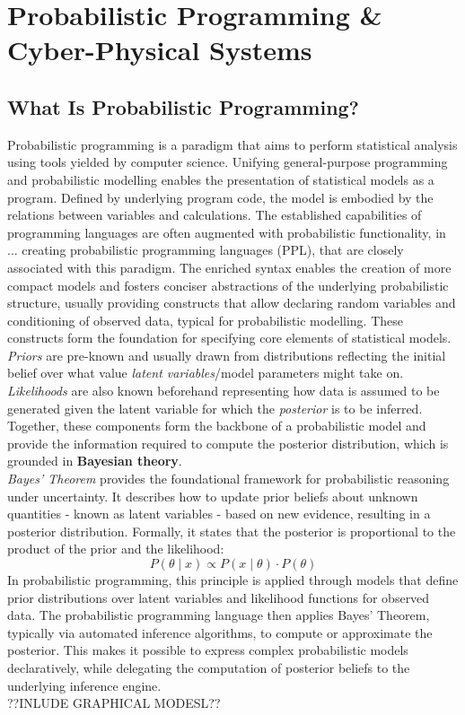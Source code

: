 \documentclass[11pt]{report}
\begin{document}
\chapter{Probabilistic Programming \& Cyber-Physical Systems}
\section{What Is Probabilistic Programming?}

Probabilistic programming is a paradigm that aims to perform statistical analysis using tools yielded by computer science.\cite{introductionprobabilisticprogramming}
Unifying general-purpose programming and probabilistic modelling enables the presentation of statistical models as a program. Defined by underlying program code, the model is
embodied by the relations between variables and calculations. The established capabilities of programming languages are often augmented with 
probabilistic functionality, in ... creating probabilistic programming languages (PPL),\cite{probProgrammingPrinciples} that are closely associated with this paradigm. 
The enriched syntax enables the creation of more compact models and fosters conciser abstractions of the underlying probabilistic structure, usually providing constructs
that allow declaring random variables and conditioning of observed data, typical for probabilistic modelling. These constructs form the foundation for specifying core elements
of statistical models. \textit{Priors} are pre-known and usually drawn from distributions reflecting the initial belief over what value
\textit{latent variables}/model parameters might take on. \textit{Likelihoods} are also known beforehand representing how data is assumed to be generated given the 
latent variable for which the \textit{posterior} is to be inferred. Together, these components form the backbone of a probabilistic model and provide the information required
to compute the posterior distribution, which is grounded in \textbf{Bayesian theory}.\cite{introductionprobabilisticprogramming}
\\

\textit{Bayes’ Theorem} provides the foundational framework for probabilistic reasoning under uncertainty. It describes how to update prior beliefs about unknown 
quantities - known as latent variables - based on new evidence, resulting in a posterior distribution. Formally, it states that the posterior is proportional to the
product of the prior and the likelihood:
\[
P(\theta \mid x) \propto P(x \mid \theta) \cdot P(\theta)
\]
In probabilistic programming, this principle is applied through models that define prior distributions over latent variables and likelihood functions for 
observed data. The probabilistic programming language then applies Bayes' Theorem, typically via automated inference algorithms, to compute or approximate the posterior.
This makes it possible to express complex probabilistic models declaratively, while delegating the computation of posterior beliefs to the underlying inference engine.
\\
??INLUDE GRAPHICAL MODESL??
\end{document}
